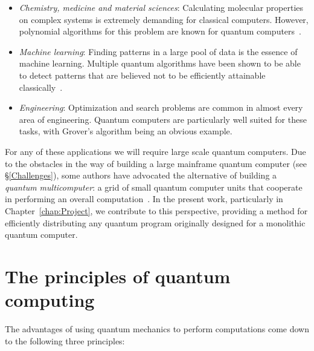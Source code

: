 \begin{itemize}
  \item \textit{Chemistry, medicine and material sciences}: Calculating molecular properties on complex systems is extremely demanding for classical computers. However, polynomial algorithms for this problem are known for quantum computers~\citep{TowardsQuantumChemistry}. %
  \item \textit{Machine learning}: Finding patterns in a large pool of data is the essence of machine learning. Multiple quantum algorithms have been shown to be able to detect patterns that are believed not to be efficiently attainable classically~\citep{QuantumMachineLearning}.
  \item \textit{Engineering}: Optimization and search problems are common in almost every area of engineering. Quantum computers are particularly well suited for these tasks, with Grover's algorithm being an obvious example.
\end{itemize}

For any of these applications we will require large scale quantum computers. Due to the obstacles in the way of building a large mainframe quantum computer (see \S\ref{Challenges}), some authors have advocated the alternative of building a \textit{quantum multicomputer}: a grid of small quantum computer units that cooperate in performing an overall computation~\citep{DistributedQCHW}. In the present work, particularly in Chapter~\ref{chap:Project}, we contribute to this perspective, providing a method for efficiently distributing any quantum program originally designed for a monolithic quantum computer.

\section{The principles of quantum computing}
\label{Principles}

The advantages of using quantum mechanics to perform computations come down to the following three principles:

